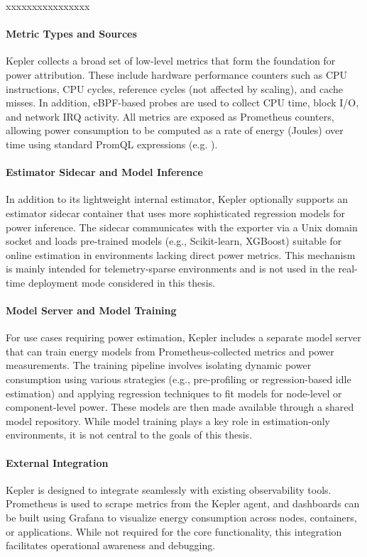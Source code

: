 xxxxxxxxxxxxxxxx



\paragraph{Metric Types and Sources}
Kepler collects a broad set of low-level metrics that form the foundation for power attribution. These include hardware performance counters such as CPU instructions, CPU cycles, reference cycles (not affected by scaling), and cache misses. In addition, eBPF-based probes are used to collect CPU time, block I/O, and network IRQ activity. All metrics are exposed as Prometheus counters, allowing power consumption to be computed as a rate of energy (Joules) over time using standard PromQL expressions (e.g. ).

\paragraph{Estimator Sidecar and Model Inference}
In addition to its lightweight internal estimator, Kepler optionally supports an estimator sidecar container that uses more sophisticated regression models for power inference. The sidecar communicates with the exporter via a Unix domain socket and loads pre-trained models (e.g., Scikit-learn, XGBoost) suitable for online estimation in environments lacking direct power metrics. This mechanism is mainly intended for telemetry-sparse environments and is not used in the real-time deployment mode considered in this thesis.

\paragraph{Model Server and Model Training}
For use cases requiring power estimation, Kepler includes a separate model server that can train energy models from Prometheus-collected metrics and power measurements. The training pipeline involves isolating dynamic power consumption using various strategies (e.g., pre-profiling or regression-based idle estimation) and applying regression techniques to fit models for node-level or component-level power. These models are then made available through a shared model repository. While model training plays a key role in estimation-only environments, it is not central to the goals of this thesis\parencite{choochotkaewAdvancingCloudSustainability2023}.

\paragraph{External Integration}
Kepler is designed to integrate seamlessly with existing observability tools. Prometheus is used to scrape metrics from the Kepler agent, and dashboards can be built using Grafana to visualize energy consumption across nodes, containers, or applications. While not required for the core functionality, this integration facilitates operational awareness and debugging.



